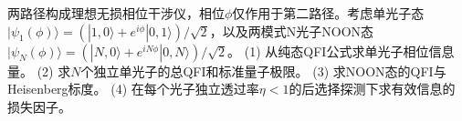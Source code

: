 两路径构成理想无损相位干涉仪，相位\(\phi\)仅作用于第二路径。考虑单光子态\(|\psi_1(\phi)\rangle=(|1,0\rangle+e^{i\phi}|0,1\rangle)/\sqrt2\)，以及两模式N光子NOON态\(|\psi_N(\phi)\rangle=(|N,0\rangle+e^{iN\phi}|0,N\rangle)/\sqrt2\)。
(1) 从纯态QFI公式求单光子相位信息量。
(2) 求\(N\)个独立单光子的总QFI和标准量子极限。
(3) 求NOON态的QFI与Heisenberg标度。
(4) 在每个光子独立透过率\(\eta<1\)的后选择探测下求有效信息的损失因子。
